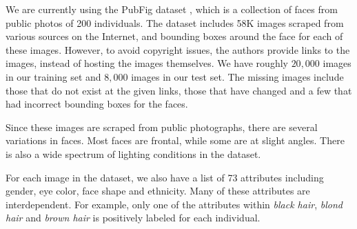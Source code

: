 \documentclass[10pt,twocolumn,letterpaper]{article}
\begin{document}
We are currently using the PubFig dataset \cite{dataset}, which is a collection of faces from public photos of 200 individuals. The dataset includes 58K images scraped from various sources on the Internet, and bounding boxes around the face for each of these images. However, to avoid copyright issues, the authors provide links to the images, instead of hosting the images themselves. We have roughly $20,000$ images in our training set and $8,000$ images in our test set. The missing images include those that do not exist at the given links, those that have changed and a few that had incorrect bounding boxes for the faces. 

Since these images are scraped from public photographs, there are several variations in faces. Most faces are frontal, while some are at slight angles. There is also a wide spectrum of lighting conditions in the dataset. 

For each image in the dataset, we also have a list of 73 attributes including gender, eye color, face shape and ethnicity. Many of these attributes are interdependent. For example, only one of the attributes within \textit{black hair}, \emph{blond hair} and \emph{brown hair} is positively labeled for each individual. 





    
\end{document}
